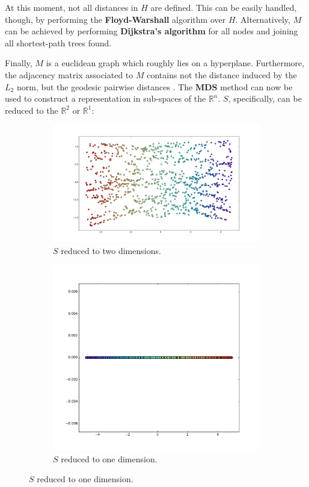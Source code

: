 \documentclass[12pt]{article}
\begin{document}
At this moment, not all distances in $H$ are defined. This can be easily handled, though, by performing the \textbf{Floyd-Warshall} algorithm over $H$. Alternatively, $M$ can be achieved by performing \textbf{Dijkstra's algorithm} for all nodes and joining all shortest-path trees found.

Finally, $M$ is a euclidean graph which roughly lies on a hyperplane. Furthermore, the adjacency matrix associated to $M$ contains not the distance induced by the $L_2$ norm, but the geodesic pairwise distances \cite{gho2006}. The \textbf{MDS} method can now be used to construct a representation in sub-spaces of the $\mathbb{R}^n$. $S$, specifically, can be reduced to the $\mathbb{R}^2$ or $\mathbb{R}^1$:

\begin{figure}[H]
    \begin{subfigure}{.5\linewidth}
		\centering
		\captionsetup{justification=centering}
		\includegraphics[width=\linewidth]{mani_s_4}
		\caption{$S$ reduced to two dimensions.}
		\label{fig:mani_s_reduced_1}
	\end{subfigure}%
	\begin{subfigure}{.5\linewidth}
		\centering
		\captionsetup{justification=centering}
		\includegraphics[width=.63\linewidth]{mani_s_5}
		\caption{$S$ reduced to one dimension.}
		\label{fig:mani_s_reduced_2}
	\end{subfigure}
\end{figure}
\end{document}

